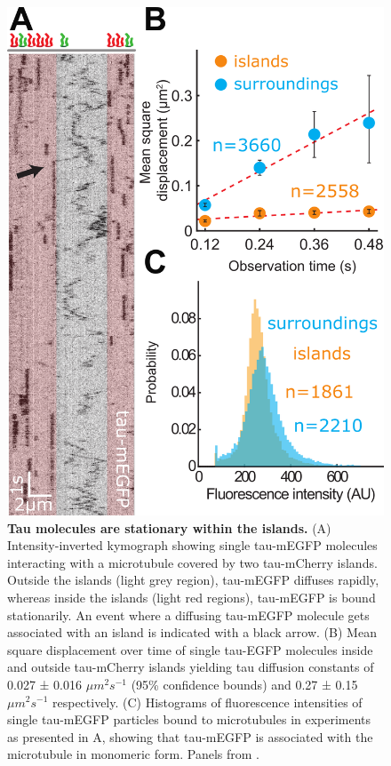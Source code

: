 \begin{figure}
	\centering
	\includegraphics[width=1\linewidth]{Figures/tau_singleMolecules.png}
	\caption[Tau molecules are stationary within the islands.]{
	\textbf{Tau molecules are stationary within the islands.} (A) Intensity-inverted kymograph showing single tau-mEGFP molecules interacting with a microtubule covered by two tau-mCherry islands. Outside the islands (light grey region), tau-mEGFP diffuses rapidly, whereas inside the islands (light red regions), tau-mEGFP is bound stationarily. An event where a diffusing tau-mEGFP molecule gets associated with an island is indicated with a black arrow. (B) Mean square displacement over time of single tau-EGFP molecules inside and outside tau-mCherry islands yielding tau diffusion constants of 0.027 ± 0.016 $\mu m^2s^{-1}$ (95\% confidence bounds) and 0.27 ± 0.15 $\mu m^2s^{-1}$ respectively. (C) Histograms of fluorescence intensities of single tau-mEGFP particles bound to microtubules in experiments as presented in A, showing that tau-mEGFP is associated with the microtubule in monomeric form. Panels from \cite{Siahaan2019a}.
		}\label{tausingle}
\end{figure}
